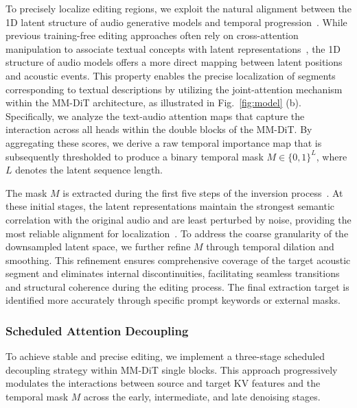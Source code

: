To precisely localize editing regions, we exploit the natural alignment between the 1D latent structure of audio generative models and temporal progression~\cite{jiang2025freeaudio,wang2025audioatlas,jiang2025controlaudio}. While previous training-free editing approaches often rely on cross-attention manipulation to associate textual concepts with latent representations~\cite{jia2025audioeditor,xu2024prompt,manor2024zero}, the 1D structure of audio models offers a more direct mapping between latent positions and acoustic events. This property enables the precise localization of segments corresponding to textual descriptions by utilizing the joint-attention mechanism within the MM-DiT architecture, as illustrated in Fig.~\ref{fig:model} (b). Specifically, we analyze the text-audio attention maps that capture the interaction across all heads within the double blocks of the MM-DiT. By aggregating these scores, we derive a raw temporal importance map that is subsequently thresholded to produce a binary temporal mask $M \in \{0, 1\}^L$, where $L$ denotes the latent sequence length.

The mask $M$ is extracted during the first five steps of the inversion process~\cite{ouyang2025proedit}. At these initial stages, the latent representations maintain the strongest semantic correlation with the original audio and are least perturbed by noise, providing the most reliable alignment for localization~\cite{yin2025consistedit}. To address the coarse granularity of the downsampled latent space, we further refine $M$ through temporal dilation and smoothing. This refinement ensures comprehensive coverage of the target acoustic segment and eliminates internal discontinuities, facilitating seamless transitions and structural coherence during the editing process. The final extraction target is identified more accurately through specific prompt keywords or external masks.

\subsubsection{Scheduled Attention Decoupling}
\label{sec:sad}

To achieve stable and precise editing, we implement a three-stage scheduled decoupling strategy within MM-DiT single blocks. This approach progressively modulates the interactions between source and target KV features and the temporal mask $M$ across the early, intermediate, and late denoising stages.


